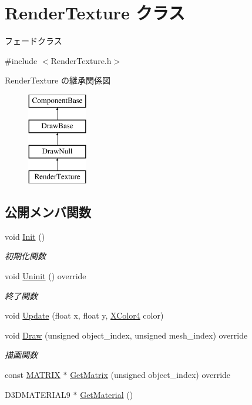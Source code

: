 \hypertarget{class_render_texture}{}\section{Render\+Texture クラス}
\label{class_render_texture}


フェードクラス  




{\ttfamily \#include $<$Render\+Texture.\+h$>$}

Render\+Texture の継承関係図\begin{figure}[H]
\begin{center}
\leavevmode
\includegraphics[height=4.000000cm]{class_render_texture}
\end{center}
\end{figure}
\subsection*{公開メンバ関数}
\begin{DoxyCompactItemize}
\item 
void \mbox{\hyperlink{class_render_texture_a498eb8be8672e01164b3770cdff43291}{Init}} ()
\begin{DoxyCompactList}\small\item\em 初期化関数 \end{DoxyCompactList}\item 
void \mbox{\hyperlink{class_render_texture_a0e55cd9b412d87dfe1f4b90f29f357c8}{Uninit}} () override
\begin{DoxyCompactList}\small\item\em 終了関数 \end{DoxyCompactList}\item 
void \mbox{\hyperlink{class_render_texture_ac27f8cfac7903dd502de61e22abfc457}{Update}} (float x, float y, \mbox{\hyperlink{_vector3_d_8h_a680c30c4a07d86fe763c7e01169cd6cc}{X\+Color4}} color)
\item 
void \mbox{\hyperlink{class_render_texture_a529ab829c676470ae5764b42cba9efb0}{Draw}} (unsigned object\+\_\+index, unsigned mesh\+\_\+index) override
\begin{DoxyCompactList}\small\item\em 描画関数 \end{DoxyCompactList}\item 
const \mbox{\hyperlink{_vector3_d_8h_a032295cd9fb1b711757c90667278e744}{M\+A\+T\+R\+IX}} $\ast$ \mbox{\hyperlink{class_render_texture_a0e9746f5cebdd088f2303e18cbc52eae}{Get\+Matrix}} (unsigned object\+\_\+index) override
\item 
D3\+D\+M\+A\+T\+E\+R\+I\+A\+L9 $\ast$ \mbox{\hyperlink{class_render_texture_adb19f86d2ac55e95d8725c64a846e8d0}{Get\+Material}} ()
\end{DoxyCompactItemize}



